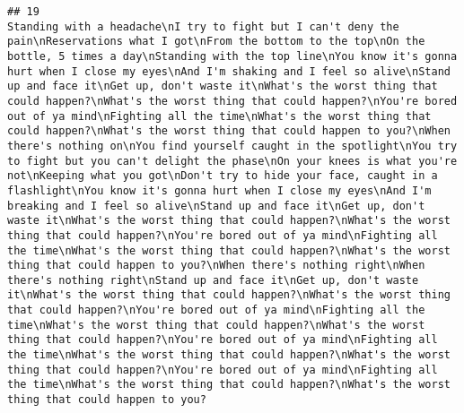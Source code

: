 \documentclass[]{article}
\begin{document}
\begin{verbatim}
## 19                                                                                                                                                                                                                                                                                                                                                                                                                                                                                                                                                                                                                                                                                                                                                                                                                                                                                                                                                                                                                                                                                                                                                                                                                                                                                                                                  Standing with a headache\nI try to fight but I can't deny the pain\nReservations what I got\nFrom the bottom to the top\nOn the bottle, 5 times a day\nStanding with the top line\nYou know it's gonna hurt when I close my eyes\nAnd I'm shaking and I feel so alive\nStand up and face it\nGet up, don't waste it\nWhat's the worst thing that could happen?\nWhat's the worst thing that could happen?\nYou're bored out of ya mind\nFighting all the time\nWhat's the worst thing that could happen?\nWhat's the worst thing that could happen to you?\nWhen there's nothing on\nYou find yourself caught in the spotlight\nYou try to fight but you can't delight the phase\nOn your knees is what you're not\nKeeping what you got\nDon't try to hide your face, caught in a flashlight\nYou know it's gonna hurt when I close my eyes\nAnd I'm breaking and I feel so alive\nStand up and face it\nGet up, don't waste it\nWhat's the worst thing that could happen?\nWhat's the worst thing that could happen?\nYou're bored out of ya mind\nFighting all the time\nWhat's the worst thing that could happen?\nWhat's the worst thing that could happen to you?\nWhen there's nothing right\nWhen there's nothing right\nStand up and face it\nGet up, don't waste it\nWhat's the worst thing that could happen?\nWhat's the worst thing that could happen?\nYou're bored out of ya mind\nFighting all the time\nWhat's the worst thing that could happen?\nWhat's the worst thing that could happen?\nYou're bored out of ya mind\nFighting all the time\nWhat's the worst thing that could happen?\nWhat's the worst thing that could happen?\nYou're bored out of ya mind\nFighting all the time\nWhat's the worst thing that could happen?\nWhat's the worst thing that could happen to you?

\end{verbatim}
\end{document}
